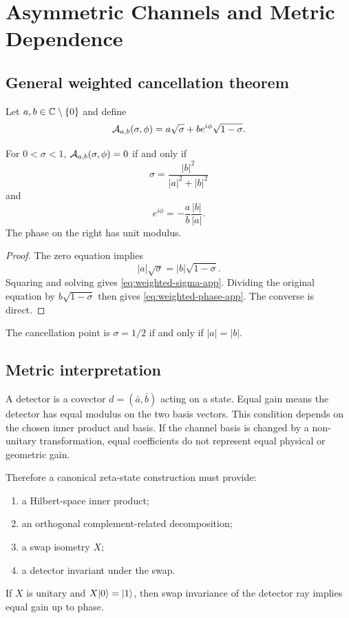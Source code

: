 \chapter{Asymmetric Channels and Metric Dependence}
\label{app:asymmetric}

\section{General weighted cancellation theorem}

Let $a,b\in\mathbb{C}\setminus\{0\}$ and define
\[
 \mathcal{A}_{a,b}(\sigma,\phi)
 =a\sqrt\sigma+b e^{i\phi}\sqrt{1-\sigma}.
\]

\begin{theorem}
\label{thm:weighted-cancellation}
For $0<\sigma<1$, $\mathcal{A}_{a,b}(\sigma,\phi)=0$ if and only if
\begin{equation}
 \sigma=\frac{|b|^2}{|a|^2+|b|^2}
 \label{eq:weighted-sigma-app}
\end{equation}
and
\begin{equation}
 e^{i\phi}=-\frac{a}{b}\frac{|b|}{|a|}.
 \label{eq:weighted-phase-app}
\end{equation}
The phase on the right has unit modulus.
\end{theorem}
\begin{proof}
The zero equation implies
\[
 |a|\sqrt\sigma=|b|\sqrt{1-\sigma}.
\]
Squaring and solving gives \cref{eq:weighted-sigma-app}. Dividing the original equation by $b\sqrt{1-\sigma}$ then gives \cref{eq:weighted-phase-app}. The converse is direct.
\end{proof}

\begin{corollary}
The cancellation point is $\sigma=1/2$ if and only if $|a|=|b|$.
\end{corollary}

\section{Metric interpretation}

A detector is a covector $d=(\bar a,\bar b)$ acting on a state. Equal gain means the detector has equal modulus on the two basis vectors. This condition depends on the chosen inner product and basis. If the channel basis is changed by a non-unitary transformation, equal coefficients do not represent equal physical or geometric gain.

Therefore a canonical zeta-state construction must provide:
\begin{enumerate}
  \item a Hilbert-space inner product;
  \item an orthogonal complement-related decomposition;
  \item a swap isometry $X$;
  \item a detector invariant under the swap.
\end{enumerate}
If $X$ is unitary and $X\lvert 0\rangle=\lvert 1\rangle$, then swap invariance of the detector ray implies equal gain up to phase.


